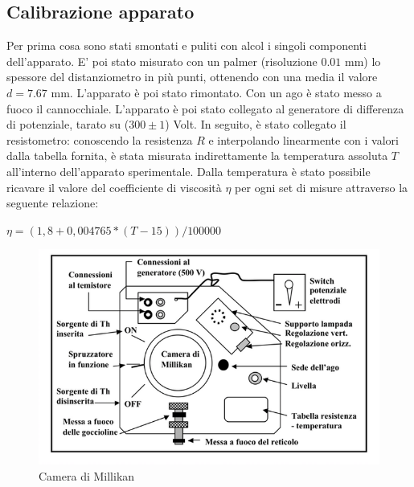 \documentclass{article}
\begin{document}
    \subsection{Calibrazione apparato}
    
        Per prima cosa sono stati smontati e puliti con alcol i singoli componenti dell'apparato. E' poi stato misurato con un palmer (risoluzione $0.01$ mm) lo spessore del distanziometro in più punti, ottenendo con una media il valore $d=7.67$ mm. L'apparato è poi stato rimontato. Con un ago è stato messo a fuoco il cannocchiale. L'apparato è poi stato collegato al generatore di differenza di potenziale, tarato su ($300 \pm 1$) Volt. In seguito, è stato collegato il resistometro: conoscendo la resistenza $R$ e interpolando linearmente con i valori dalla tabella fornita, è stata misurata indirettamente la temperatura assoluta $T$ all'interno dell'apparato sperimentale. Dalla temperatura è stato possibile ricavare il valore del coefficiente di viscosità $\eta$ per ogni set di misure attraverso la seguente relazione:\\
        \begin{center} $ \eta=(1,8+0,004765*(T-15))/100000$ 
        \end{center}

        \begin{figure}[H]
            \centering
            \includegraphics[width=0.9\linewidth]{../images/camera.png}
            \caption{Camera di Millikan}
            \label{fig:camera_millikan}
        \end{figure}
        
\end{document}

